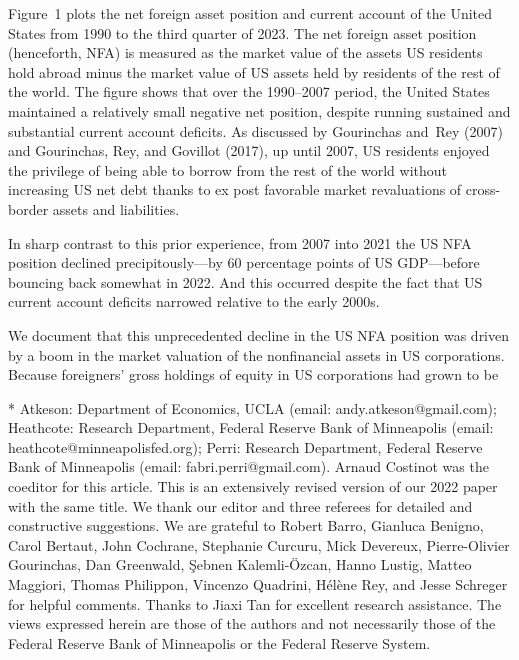 \documentclass[11pt]{article}
\begin{document}
Figure 1 plots the net foreign asset position and current account of the United States from 1990 to the third quarter of 2023. The net foreign asset position (henceforth, NFA) is measured as the market value of the assets US residents hold abroad minus the market value of US assets held by residents of the rest of the world. The figure shows that over the 1990–2007 period, the United States maintained a relatively small negative net position, despite running sustained and substantial current account deficits. As discussed by Gourinchas and Rey (2007) and Gourinchas, Rey, and Govillot (2017), up until 2007, US residents enjoyed the privilege of being able to borrow from the rest of the world without increasing US net debt thanks to ex post favorable market revaluations of cross-border assets and liabilities.


In sharp contrast to this prior experience, from 2007 into 2021 the US NFA position declined precipitously—by 60 percentage points of US GDP—before bouncing back somewhat in 2022. And this occurred despite the fact that US current account deficits narrowed relative to the early 2000s.


We document that this unprecedented decline in the US NFA position was driven by a boom in the market valuation of the nonfinancial assets in US corporations. Because foreigners’ gross holdings of equity in US corporations had grown to be


* Atkeson: Department of Economics, UCLA (email: andy.atkeson@gmail.com); Heathcote: Research Department, Federal Reserve Bank of Minneapolis (email: heathcote@minneapolisfed.org); Perri: Research Department, Federal Reserve Bank of Minneapolis (email: fabri.perri@gmail.com). Arnaud Costinot was the coeditor for this article. This is an extensively revised version of our 2022 paper with the same title. We thank our editor and three referees for detailed and constructive suggestions. We are grateful to Robert Barro, Gianluca Benigno, Carol Bertaut, John Cochrane, Stephanie Curcuru, Mick Devereux, Pierre-Olivier Gourinchas, Dan Greenwald, Şebnen Kalemli-Özcan, Hanno Lustig, Matteo Maggiori, Thomas Philippon, Vincenzo Quadrini, Hélène Rey, and Jesse Schreger for helpful comments. Thanks to Jiaxi Tan for excellent research assistance. The views expressed herein are those of the authors and not necessarily those of the Federal Reserve Bank of Minneapolis or the Federal Reserve System.
\end{document}
